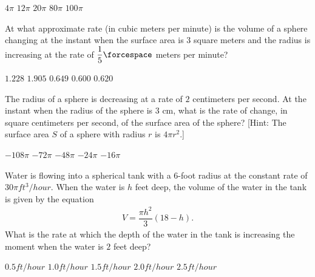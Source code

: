 \begin{questions}
    \begin{oneparchoices}
        \choice $4\pi$
        \choice $12\pi$
        \choice $20\pi$
        \choice $80\pi$
        \choice $100\pi$
    \end{oneparchoices} \par \horizontalline

    \question At what approximate rate (in cubic meters per minute) is the volume of a sphere changing at the instant when the surface area is $3$ square meters and the radius is increasing at the rate of $\dfrac{1}{5} \forcespace$ meters per minute? \\

    \begin{oneparchoices}
        \choice $1.228$
        \choice $1.905$
        \choice $0.649$
        \choice $0.600$
        \choice $0.620$
    \end{oneparchoices} \par \horizontalline 

    \question The radius of a sphere is decreasing at a rate of $2$ centimeters per second. At the instant when the radius of the sphere is $3$ cm, what is the rate of change, in square centimeters per second, of the surface area of the sphere? [Hint: The surface area $S$ of a sphere with radius $r$ is $4\pi r^2$.] \\

    \begin{oneparchoices}
        \choice $-108\pi$
        \choice $-72\pi$
        \choice $-48\pi$
        \choice $-24\pi$
        \choice $-16\pi$
    \end{oneparchoices} \par \horizontalline

    \question Water is flowing into a spherical tank with a $6$-foot radius at the constant rate of $30\pi \si{ft^3 \per hour}$. When the water is $h$ feet deep, the volume of the water in the tank is given by the equation \begin{align*}
        V = \dfrac{\pi h^2}{3}(18 - h).
    \end{align*}
    What is the rate at which the depth of the water in the tank is increasing the moment when the water is $2$ feet deep? \\

    \begin{oneparchoices}
        \choice $0.5 \si{ft \per hour}$
        \choice $1.0 \si{ft \per hour}$
        \choice $1.5 \si{ft \per hour}$
        \choice $2.0 \si{ft \per hour}$
        \choice $2.5 \si{ft \per hour}$
    \end{oneparchoices} \par \horizontalline


\end{questions}
